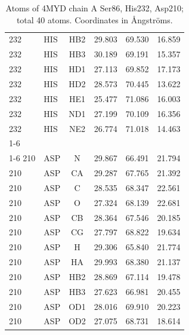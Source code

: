 \begin{table}[htbp]
{\begin{tabular}{@{}llcrrr@{}}
232  & HIS  & HB2   &  29.803 &  69.530 &  16.859 \\
232  & HIS  & HB3   &  30.189 &  69.191 &  15.357 \\
232  & HIS  & HD1   &  27.113 &  69.852 &  17.173 \\
232  & HIS  & HD2   &  28.573 &  70.445 &  13.622 \\
232  & HIS  & HE1   &  25.477 &  71.086 &  16.003 \\
232  & HIS  & ND1   &  27.199 &  70.109 &  16.356 \\
232  & HIS  & NE2   &  26.774 &  71.018 &  14.463 \\
\cmidrule(lr){1-6}
\multicolumn{6}{@{}l}{\textbf{Asp210 (Chain A, Res 210, ASP)}} \\
\cmidrule(r){1-6}
210  & ASP  & N     &  29.867 &  66.491 &  21.794 \\
210  & ASP  & CA    &  29.287 &  67.765 &  21.392 \\
210  & ASP  & C     &  28.535 &  68.347 &  22.561 \\
210  & ASP  & O     &  27.324 &  68.139 &  22.681 \\
210  & ASP  & CB    &  28.364 &  67.546 &  20.185 \\
210  & ASP  & CG    &  27.797 &  68.822 &  19.634 \\
210  & ASP  & H     &  29.306 &  65.840 &  21.774 \\
210  & ASP  & HA    &  29.993 &  68.380 &  21.137 \\
210  & ASP  & HB2   &  28.869 &  67.114 &  19.478 \\
210  & ASP  & HB3   &  27.623 &  66.981 &  20.455 \\
210  & ASP  & OD1   &  28.016 &  69.910 &  20.223 \\
210  & ASP  & OD2   &  27.075 &  68.731 &  18.614 \\
\bottomrule
\end{tabular}%
}
\caption{Atoms of 4MYD chain A Ser86, His232, Asp210; total 40 atoms. Coordinates in \AA ngstr\"oms.}
\label{tab:4myd_ser86_his232_asp210}
\end{table}
